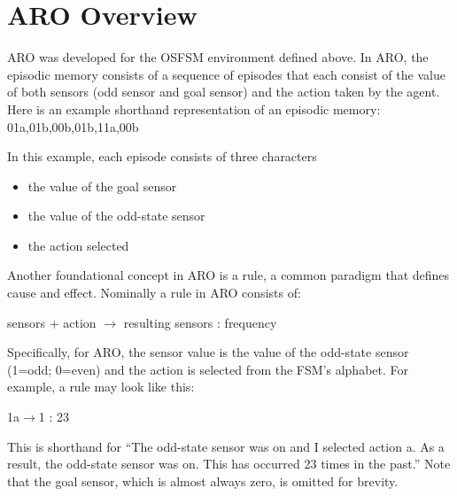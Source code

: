 \documentclass[letterpaper]{article} %
\begin{document}


\section{ARO Overview}

ARO was developed for the OSFSM environment defined above.  In ARO,
the episodic memory consists of a sequence of episodes that each
consist of the value of both sensors (odd sensor and goal sensor) and
the action taken by the agent.  Here is an example shorthand
representation of an episodic memory: 01a,01b,00b,01b,11a,00b

In this example, each episode consists of three characters
\begin{itemize}
\item the value of the goal sensor
\item the value of the odd-state sensor
\item the action selected
\end{itemize}


Another foundational concept in ARO is a rule, a common paradigm that
defines cause and effect.  Nominally a rule in ARO consists of:

    sensors + action $\rightarrow$ resulting sensors : frequency

Specifically, for ARO, the sensor value is the value of the odd-state
sensor (1=odd; 0=even) and the action is selected from the FSM's
alphabet. For example, a rule may look like this:

\begin{center}
    1a$\rightarrow$1 : 23
\end{center}

This is shorthand for ``The odd-state sensor was on and I selected
action a.  As a result, the odd-state sensor was on.  This has
occurred 23 times in the past.''  Note that the goal sensor, which is
almost always zero, is omitted for brevity.
\end{document}
